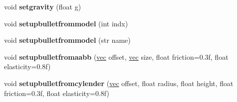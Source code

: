 \begin{DoxyCompactItemize}
void {\bfseries setgravity} (float g)
\item 
\mbox{\label{structnode_a13205d8494907c183b4ea1d8bc343053}} 
void {\bfseries setupbulletfrommodel} (int indx)
\item 
\mbox{\label{structnode_a81c70d33dcd2dc70f21a09f43dddbb30}} 
void {\bfseries setupbulletfrommodel} (str name)
\item 
\mbox{\label{structnode_a8433ac78cebc23a99d23894edeaa3877}} 
void {\bfseries setupbulletfromaabb} (\hyperlink{structvec}{vec} offset, \hyperlink{structvec}{vec} size, float friction=0.\+3f, float elasticity=0.\+8f)
\item 
\mbox{\label{structnode_a49e88482d7aa39bfe68107bd64f0a27c}} 
void {\bfseries setupbulletfromcylender} (\hyperlink{structvec}{vec} offset, float radius, float height, float friction=0.\+3f, float elasticity=0.\+8f)
\end{DoxyCompactItemize}
